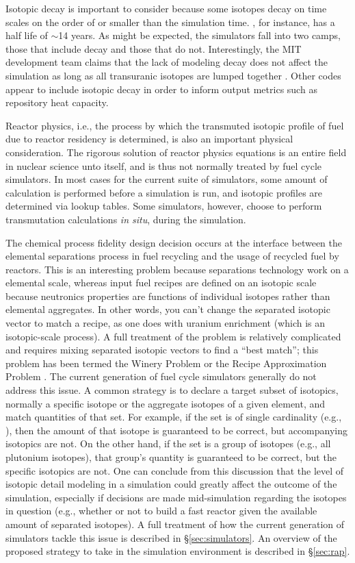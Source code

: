 Isotopic decay is important to consider because some isotopes decay on time
scales on the order of or smaller than the simulation time. , for
instance, has a half life of $\sim$14 years. As might be expected, the
simulators fall into two camps, those that include decay and those that do
not. Interestingly, the MIT development team claims that the lack of modeling
decay does not affect the simulation as long as all transuranic isotopes are
lumped together \cite{guerin_impact_2009}. Other codes appear to include
isotopic decay in order to inform output metrics such as repository heat
capacity. 

Reactor physics, i.e., the process by which the transmuted isotopic profile of
fuel due to reactor residency is determined, is also an important physical
consideration. The rigorous solution of reactor physics equations is an entire
field in nuclear science unto itself, and is thus not normally treated by fuel
cycle simulators. In most cases for the current suite of simulators, some amount
of calculation is performed before a simulation is run, and isotopic profiles
are determined via lookup tables. Some simulators, however, choose to perform
transmutation calculations \textit{in situ}, during the simulation.

The chemical process fidelity design decision occurs at the interface between
the elemental separations process in fuel recycling and the usage of recycled
fuel by reactors. This is an interesting problem because separations technology
work on a elemental scale, whereas input fuel recipes are defined on an isotopic
scale because neutronics properties are functions of individual isotopes rather
than elemental aggregates. In other words, you can't change the separated
isotopic vector to match a recipe, as one does with uranium enrichment (which is
an isotopic-scale process). A full treatment of the problem is relatively
complicated and requires mixing separated isotopic vectors to find a ``best
match''; this problem has been termed the Winery Problem or the Recipe
Approximation Problem \cite{oliver_geniusv2:_2009}. The current generation of
fuel cycle simulators generally do not address this issue. A common strategy is
to declare a target subset of isotopics, normally a specific isotope or the
aggregate isotopes of a given element, and match quantities of that set. For
example, if the set is of single cardinality (e.g., ), then the
amount of that isotope is guaranteed to be correct, but accompanying isotopics
are not. On the other hand, if the set is a group of isotopes (e.g., all
plutonium isotopes), that group's quantity is guaranteed to be correct, but the
specific isotopics are not. One can conclude from this discussion that the level
of isotopic detail modeling in a simulation could greatly affect the outcome of
the simulation, especially if decisions are made mid-simulation regarding the
isotopes in question (e.g., whether or not to build a fast reactor given the
available amount of separated isotopes). A full treatment of how the current
generation of simulators tackle this issue is described in
\S\ref{sec:simulators}. An overview of the proposed strategy to take in the
\Cyclus simulation environment is described in \S\ref{sec:rap}.

